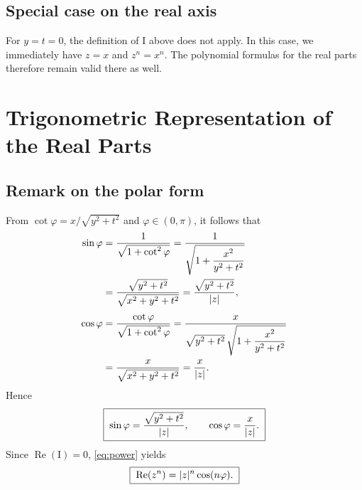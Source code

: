 \documentclass[11pt,a4paper]{article}
\newcommand{\I}{\mathrm{I}}
\DeclareMathOperator{\Real}{Re}
\DeclarePairedDelimiter{\abs}{\lvert}{\rvert}
\begin{document}
\subsection*{Special case on the real axis}
For $y=t=0$, the definition of $\I$ above does not apply.
In this case, we immediately have $z=x$ and $z^n=x^n$.
The polynomial formulas for the real parts therefore remain valid there as well.

\newpage

\section*{Trigonometric Representation of the Real Parts}

\subsection*{Remark on the polar form}
From $\cot\varphi=x/\sqrt{y^2+t^2}$ and $\varphi\in(0,\pi)$, it follows that
\begin{align*}
  \sin\varphi
    &=\frac{1}{\sqrt{1+\cot^2\varphi}}
     =\frac{1}{\sqrt{1+\dfrac{x^2}{y^2+t^2}}}\\
    &=\frac{\sqrt{y^2+t^2}}{\sqrt{x^2+y^2+t^2}}
     =\frac{\sqrt{y^2+t^2}}{\abs{z}},\\[3pt]
  \cos\varphi
    &=\frac{\cot\varphi}{\sqrt{1+\cot^2\varphi}}
     =\frac{x}{\sqrt{y^2+t^2}\,
       \sqrt{1+\dfrac{x^2}{y^2+t^2}}}\\
    &=\frac{x}{\sqrt{x^2+y^2+t^2}}
     =\frac{x}{\abs{z}}.
\end{align*}
Hence
\[
  \boxed{\;
    \sin\varphi=\frac{\sqrt{y^2+t^2}}{\abs{z}},
    \qquad
    \cos\varphi=\frac{x}{\abs{z}}.
  \;}
\]
Since $\Real(\I)=0$, \eqref{eq:power} yields
\[
  \boxed{\;\Real(z^n)=\abs{z}^{n}\cos(n\varphi).\;}
\]
\end{document}
